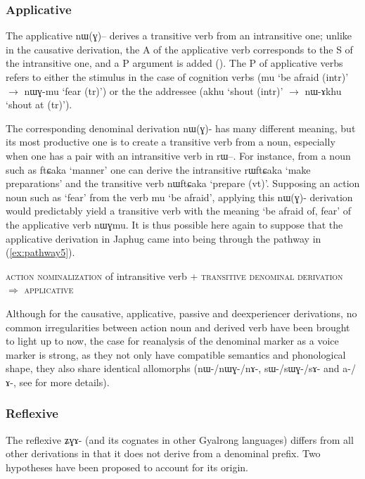 \documentclass[oldfontcommands,oneside,a4paper,11pt]{article}
\newcommand{\ipa}[1]{\mbox{\phon #1}} %
\begin{document}
\subsubsection{Applicative} \label{sec:appl}
The applicative \ipa{nɯ(ɣ)--} derives a transitive verb from an intransitive one; unlike in the causative derivation, the A of the applicative verb corresponds to the S of the intransitive one, and a P argument is added (\citealt{jacques13tropative}). The P of applicative verbs refers to either the stimulus in the case of cognition verbs (\ipa{mu} `be afraid (intr)' $\rightarrow$ \ipa{nɯɣ-mu} `fear (tr)') or the the addressee (\ipa{akhu} `shout (intr)'  $\rightarrow$ \ipa{nɯ-ɤkhu} `shout at (tr)'). 

The corresponding denominal derivation \ipa{nɯ(ɣ)-} has many different meaning, but its most productive one is to create a transitive verb from a noun, especially when one has a pair with an intransitive verb in \ipa{rɯ--}. For instance, from a noun such as \ipa{ftɕaka} `manner' one can derive the intransitive \ipa{rɯftɕaka} `make preparations' and the transitive verb \ipa{nɯftɕaka} `prepare (vt)'. Supposing an action noun such as `fear' from the verb \ipa{mu}  `be afraid', applying this \ipa{nɯ(ɣ)-} derivation would predictably yield a transitive verb with the meaning `be afraid of, fear' of the applicative verb \ipa{nɯɣmu}. It is thus possible here again to suppose that the applicative derivation in Japhug came into being through the pathway in (\ref{ex:pathway5}).

\begin{exe}
\ex \label{ex:pathway5}
\glt \textsc{action nominalization} of intransitive verb + \textsc{transitive denominal derivation} $\Rightarrow$ \textsc{applicative}
\end{exe}

Although for the causative, applicative, passive and deexperiencer derivations, no common irregularities between action noun and derived verb have been brought to light up to now, the case for reanalysis of the denominal marker as a voice marker is strong, as they not only have compatible semantics and phonological shape, they also share identical allomorphs (\ipa{nɯ-/nɯɣ-/nɤ-}, \ipa{sɯ-/sɯɣ-/sɤ-} and \ipa{a-/ɤ-}, see \citealt{jacques13tropative, jacques15causative, jacques07passif} for more details). 


\subsubsection{Reflexive} \label{sec:refl}
The reflexive \ipa{ʑɣɤ-} (and its cognates in other Gyalrong languages) differs from all other derivations in that it does not derive from a denominal prefix. Two hypotheses have been proposed to account for its origin. 
\end{document}
